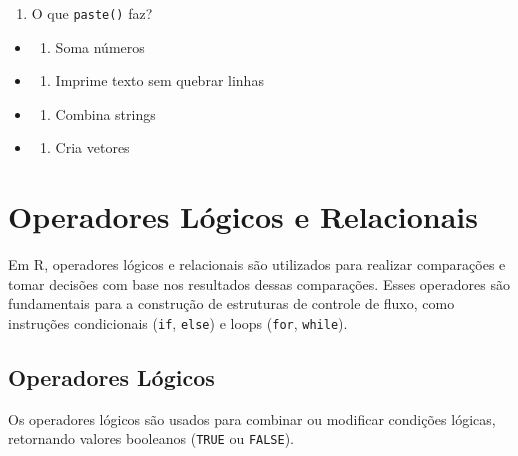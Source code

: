\documentclass[
]{book}
\providecommand{\tightlist}{%
  \setlength{\itemsep}{0pt}\setlength{\parskip}{0pt}}
\begin{document}
\begin{enumerate}
\def\labelenumi{\arabic{enumi}.}
\setcounter{enumi}{12}
\tightlist
\item
  O que \texttt{paste()} faz?
\end{enumerate}

\begin{itemize}
\tightlist
\item
  \begin{enumerate}
  \def\labelenumi{\alph{enumi})}
  \tightlist
  \item
    Soma números
  \end{enumerate}
\item
  \begin{enumerate}
  \def\labelenumi{\alph{enumi})}
  \setcounter{enumi}{1}
  \tightlist
  \item
    Imprime texto sem quebrar linhas
  \end{enumerate}
\item
  \begin{enumerate}
  \def\labelenumi{\alph{enumi})}
  \setcounter{enumi}{2}
  \tightlist
  \item
    Combina strings
  \end{enumerate}
\item
  \begin{enumerate}
  \def\labelenumi{\alph{enumi})}
  \setcounter{enumi}{3}
  \tightlist
  \item
    Cria vetores
  \end{enumerate}
\end{itemize}

\section{Operadores Lógicos e Relacionais}\label{operadores-luxf3gicos-e-relacionais}

Em R, operadores lógicos e relacionais são utilizados para realizar
comparações e tomar decisões com base nos resultados dessas comparações.
Esses operadores são fundamentais para a construção de estruturas de
controle de fluxo, como instruções condicionais (\texttt{if}, \texttt{else}) e loops
(\texttt{for}, \texttt{while}).

\subsection{Operadores Lógicos}\label{operadores-luxf3gicos}

Os operadores lógicos são usados para combinar ou modificar condições
lógicas, retornando valores booleanos (\texttt{TRUE} ou \texttt{FALSE}).
\end{document}
